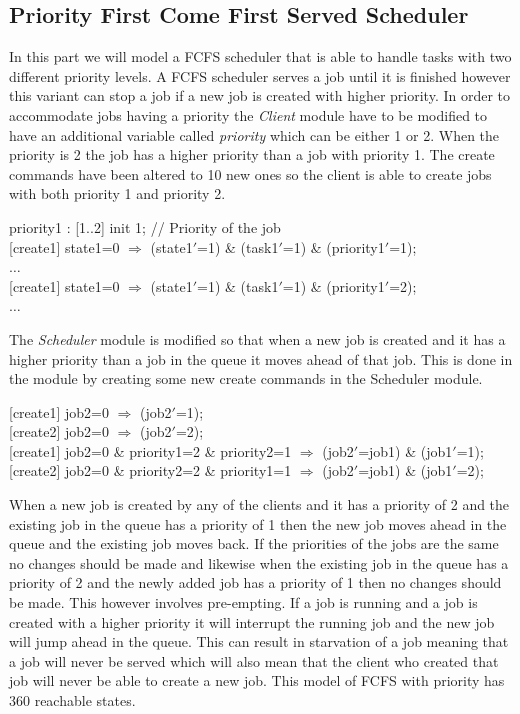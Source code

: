\documentclass[12pt]{report}
\begin{document}
\subsection*{Priority First Come First Served Scheduler}
In this part we will model a FCFS scheduler that is able to handle tasks with two different priority levels. A FCFS scheduler serves a job until it is finished however this variant can stop a job if a new job is created with higher priority. In order to accommodate jobs having a priority the \emph{Client} module have to be modified to have an additional variable called \emph{priority} which can be either 1 or 2. When the priority is 2 the job has a higher priority than a job with priority 1. The create commands have been altered to 10 new ones so the client is able to create jobs with both priority 1 and priority 2.
\begin{center}
priority1 : [1..2] init 1; // Priority of the job\\
{[create1]} state1=0 $\Rightarrow$ (state1$'$=1) \& (task1$'$=1) \& (priority1$'$=1);\\
$\dots$\\
{[create1]} state1=0 $\Rightarrow$ (state1$'$=1) \& (task1$'$=1) \& (priority1$'$=2);\\
$\dots$
\end{center}
The \emph{Scheduler} module is modified so that when a new job is created and it has a higher priority than a job in the queue it moves ahead of that job. This is done in the module by creating some new create commands in the Scheduler module.
\begin{center}
{[create1]} job2=0 $\Rightarrow$ (job2$'$=1);\\
{[create2]} job2=0 $\Rightarrow$ (job2$'$=2);\\
{[create1]} job2=0 \& priority1=2 \& priority2=1 $\Rightarrow$ (job2$'$=job1) \& (job1$'$=1);\\
{[create2]} job2=0 \& priority2=2 \& priority1=1 $\Rightarrow$ (job2$'$=job1) \& (job1$'$=2);
\end{center}
When a new job is created by any of the clients and it has a priority of 2 and the existing job in the queue has a priority of 1 then the new job moves ahead in the queue and the existing job moves back. If the priorities of the jobs are the same no changes should be made and likewise when the existing job in the queue has a priority of 2 and the newly added job has a priority of 1 then no changes should be made. This however involves pre-empting. If a job is running and a job is created with a higher priority it will interrupt the running job and the new job will jump ahead in the queue. This can result in starvation of a job meaning that a job will never be served which will also mean that the client who created that job will never be able to create a new job. This model of FCFS with priority has 360 reachable states.\\
\end{document}
